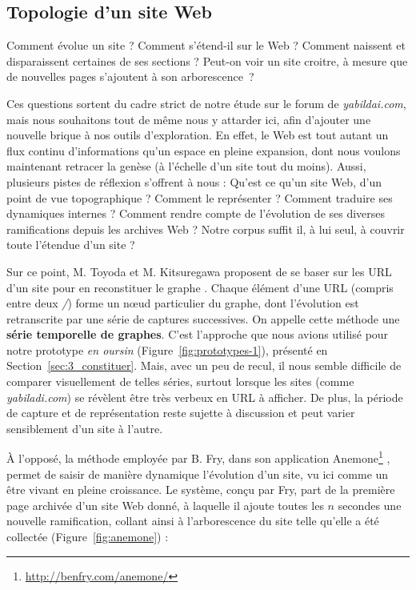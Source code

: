 \documentclass[symmetric,justified,marginals=raggedouter]{tufte-book}
\begin{document}
\subsection{Topologie d'un site Web}

\noindent Comment évolue un site ? Comment s'étend-il sur le Web ? Comment naissent et disparaissent certaines de ses sections ? Peut-on voir un site croitre, à mesure que de nouvelles pages s'ajoutent à son arborescence~? 

Ces questions sortent du cadre strict de notre étude sur le forum de \textit{yabildai.com}, mais nous souhaitons tout de même nous y attarder ici, afin d'ajouter une nouvelle brique à nos outils d'exploration. En effet, le Web est tout autant un flux continu d'informations qu'un espace en pleine expansion, dont nous voulons maintenant retracer la genèse (à l'échelle d'un site tout du moins). Aussi, plusieurs pistes de réflexion s'offrent à nous : Qu'est ce qu'un site Web, d'un point de vue topographique ? Comment le représenter ? Comment traduire ses dynamiques internes ? Comment rendre compte de l'évolution de ses diverses ramifications depuis les archives Web ? Notre corpus suffit il, à lui seul, à couvrir toute l'étendue d'un site ? 

Sur ce point, M. Toyoda et M. Kitsuregawa proposent de se baser sur les URL d'un site pour en reconstituer le graphe \citep{toyoda_extracting_2003,toyoda_system_2005}. Chaque élément d'une URL (compris entre deux \textit{/}) forme un nœud particulier du graphe, dont l'évolution est retranscrite par une série de captures successives. On appelle cette méthode une \textbf{série temporelle de graphes}. C'est l'approche que nous avions utilisé pour notre prototype \textit{en oursin} (Figure~\ref{fig:prototypes-1}), présenté en Section~\ref{sec:3_constituer}. Mais, avec un peu de recul, il nous semble difficile de comparer visuellement de telles séries, surtout lorsque les sites (comme \textit{yabiladi.com}) se révèlent être très verbeux en URL à afficher. De plus, la période de capture et de représentation reste sujette à discussion et peut varier sensiblement d'un site à l'autre.

À l'opposé, la méthode employée par B. Fry, dans son application Anemone\footnote{\RaggedOuter \url{http://benfry.com/anemone/}} \citep[p.76-82]{fry_organic_2000}, permet de saisir de manière dynamique l'évolution d'un site, vu ici comme un être vivant en pleine croissance. Le système, conçu par Fry, part de la première page archi\-vée d'un site Web donné, à laquelle il ajoute toutes les $n$ secondes une nouvelle ramification, collant ainsi à l'arborescence du site telle qu'elle a été collectée (Figure~\ref{fig:anemone}) :
\end{document}
